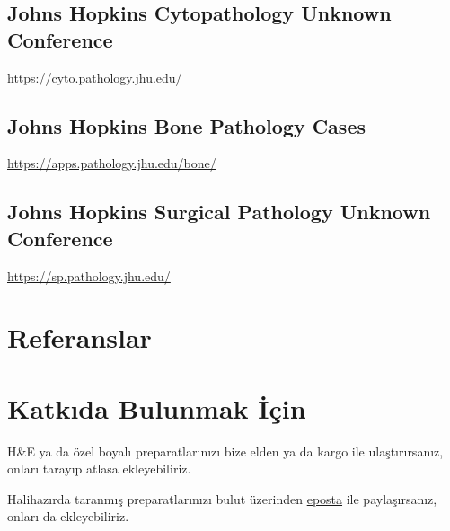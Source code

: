 \documentclass[
  letterpaper,
  DIV=11,
  numbers=noendperiod]{scrreprt}
\newlength{\cslhangindent}
\newlength{\cslentryspacingunit} %
\newenvironment{CSLReferences}[2] %
 {%
  \setlength{\parindent}{0pt}
  \ifodd #1
  \let\oldpar\par
  \def\par{\hangindent=\cslhangindent\oldpar}
  \fi
  \setlength{\parskip}{#2\cslentryspacingunit}
 }%
 {}
\begin{document}
\hypertarget{johns-hopkins-cytopathology-unknown-conference}{%
\section{Johns Hopkins Cytopathology Unknown
Conference}\label{johns-hopkins-cytopathology-unknown-conference}}

\url{https://cyto.pathology.jhu.edu/}

\hypertarget{johns-hopkins-bone-pathology-cases}{%
\section{Johns Hopkins Bone Pathology
Cases}\label{johns-hopkins-bone-pathology-cases}}

\url{https://apps.pathology.jhu.edu/bone/}

\hypertarget{johns-hopkins-surgical-pathology-unknown-conference}{%
\section{Johns Hopkins Surgical Pathology Unknown
Conference}\label{johns-hopkins-surgical-pathology-unknown-conference}}

\url{https://sp.pathology.jhu.edu/}


\hypertarget{referanslar}{%
\chapter*{Referanslar}\label{referanslar}}


\hypertarget{refs}{}
\begin{CSLReferences}{0}{0}
\end{CSLReferences}

\cleardoublepage
{}
{}
\appendix

\hypertarget{sec-katki}{%
\chapter{Katkıda Bulunmak İçin}\label{sec-katki}}

H\&E ya da özel boyalı preparatlarınızı bize elden ya da kargo ile
ulaştırırsanız, onları tarayıp atlasa ekleyebiliriz.

Halihazırda taranmış preparatlarınızı bulut üzerinden
\href{mailto:bilgi@patolojiatlasi.com}{eposta} ile paylaşırsanız, onları
da ekleyebiliriz.
\end{document}
